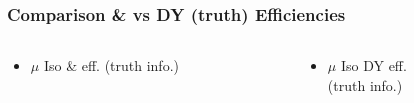\documentclass{beamer}
\begin{document}
\begin{frame}
 \frametitle{Comparison \ttbar \& \wpj vs DY (truth) Efficiencies}
  \begin{columns}

   \begin{column}{0.33\textwidth}
     \begin{itemize}
   \item $\mu$ Iso \ttbar \& \wpj eff. (truth info.)
  \end{itemize}
   \end{column}
   \begin{column}{0.33\textwidth}
   \begin{itemize}
    \item $\mu$ Iso DY eff. \\(truth info.)
   \end{itemize}


\end{column}
\end{columns}
\end{frame}
\end{document}
